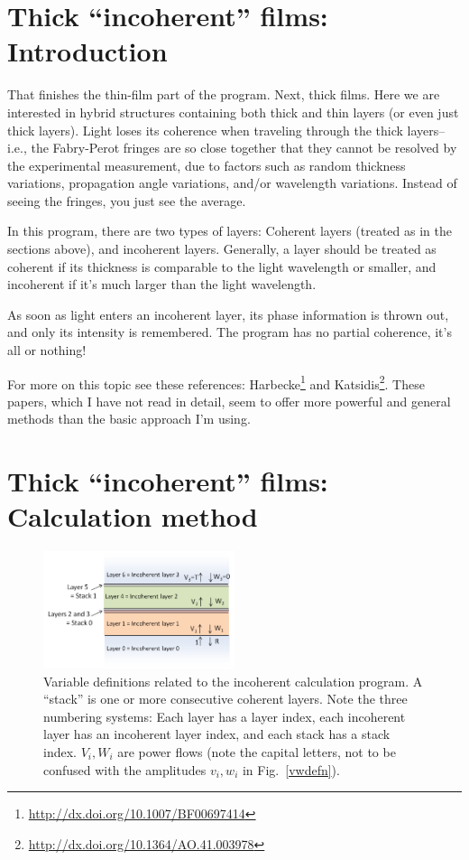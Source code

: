 \documentclass[12pt]{article}
\renewcommand{\(}{\left(}
\renewcommand{\)}{\right)}
\begin{document}
\section{Thick ``incoherent'' films: Introduction}
That finishes the thin-film part of the program. Next, thick films. Here we are interested in hybrid structures containing both thick and thin layers (or even just thick layers). Light loses its coherence when traveling through the thick layers--i.e., the Fabry-Perot fringes are so close together that they cannot be resolved by the experimental measurement, due to factors such as random thickness variations, propagation angle variations, and/or wavelength variations. Instead of seeing the fringes, you just see the average.

In this program, there are two types of layers: Coherent layers (treated as in the sections above), and incoherent layers. Generally, a layer should be treated as coherent if its thickness is comparable to the light wavelength or smaller, and incoherent if it's much larger than the light wavelength.

As soon as light enters an incoherent layer, its phase information is thrown out, and only its intensity is remembered. The program has no partial coherence, it's all or nothing!

For more on this topic see these references: Harbecke\footnote{\url{http://dx.doi.org/10.1007/BF00697414}} and Katsidis\footnote{\url{http://dx.doi.org/10.1364/AO.41.003978}}. These papers, which I have not read in detail, seem to offer more powerful and general methods than the basic approach I'm using.

\section{Thick ``incoherent'' films: Calculation method}

\begin{figure}[htb]
\centering
\includegraphics[width=0.5\textwidth]{incoherentfig.png}
\caption{Variable definitions related to the incoherent calculation program. A ``stack'' is one or more consecutive coherent layers. Note the three numbering systems: Each layer has a layer index, each incoherent layer has an incoherent layer index, and each stack has a stack index. $V_i,W_i$ are power flows (note the capital letters, not to be confused with the amplitudes $v_i,w_i$ in Fig.~\ref{vwdefn}).\label{incoherentfig}}
\end{figure}
\end{document}
